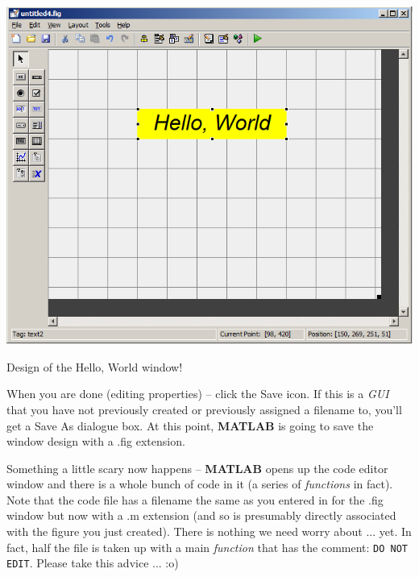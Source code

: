 \documentclass{tufte-book} %
\begin{document}
\begin{marginfigure}[-0.0in]
\includegraphics[width=\linewidth]{chGUI-HelloWorld.png}
\caption{Design of the Hello, World window!}
\label{fig:chGUI-HelloWorld}
\end{marginfigure}

When you are done (editing properties) -- click the \textsf{Save} icon. If this is a \textit{GUI} that you have not previously created or previously assigned a filename to, you'll get a \textsf{Save As} dialogue box. At this point, \textbf{MATLAB} is going to save the window design with a \textsf{.fig} extension.

Something a little scary now happens -- \textbf{MATLAB} opens up the \textsf{code editor window} and there is a whole bunch of code in it (a series of \textit{functions} in fact). Note that the code file has a filename the same as you entered in for the \textsf{.fig} window but now with a \textsf{.m} extension (and so is presumably directly associated with the figure you just created). There is nothing we need worry about ... yet. In fact, half the file is taken up with a main \textit{function} that has the comment: \texttt{DO NOT EDIT}. Please take this advice ... :o)
\end{document}
